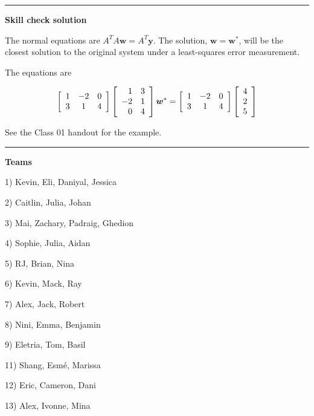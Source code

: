 \documentclass[12pt,letterpaper,noanswers]{exam}
\newcommand{\vc}[1]{\boldsymbol{#1}}
\begin{document}
\vspace{0.2cm}
\hrule
\vspace{0.2cm}

\noindent \textbf{Skill check solution}
\begin{questions}
\item The normal equations are $A^TA\vc{w} = A^T\vc{y}$.  The solution, $\vc{w} = \vc{w}^*$, will be the closest solution to the original system under a least-squares error measurement.

The equations are

\[\left[\begin{array}{c c c}
1 & -2 & 0 \\
3 & 1 & 4
\end{array}\right]\left[\begin{array}{r r}
1 & 3 \\
-2 & 1 \\
0 & 4
\end{array}\right] \vc{w}^* = \left[\begin{array}{c c c}
1 & -2 & 0 \\
3 & 1 & 4
\end{array}\right] \left[\begin{array}{ r}
4 \\ 2 \\ 5\end{array}\right]\]

\item See the Class 01 handout for the example.
\end{questions}
\vspace{0.2cm}
\hrule
\vspace{0.2cm}

\noindent \textbf{Teams}

\begin{multicols}{3}
1) Kevin, Eli, Daniyal, Jessica

2) Caitlin, Julia, Johan

3) Mai, Zachary, Padraig, Ghedion

4) Sophie, Julia, Aidan

5) RJ, Brian, Nina

6) Kevin, Mack, Ray

7) Alex, Jack, Robert

8) Nini, Emma, Benjamin

9) Eletria, Tom, Basil

11) Shang, Esmé, Marissa

12) Eric, Cameron, Dani

13) Alex, Ivonne, Mina
\end{multicols}
\end{document}
